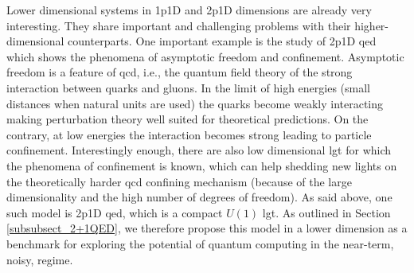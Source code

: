 Lower dimensional systems in \gls{1p1D} and \gls{2p1D} dimensions are already very interesting. They share important and challenging problems with their higher-dimensional counterparts. One important example is the study of \gls{2p1D} \gls{qed} which shows the phenomena of asymptotic freedom and confinement. Asymptotic freedom is a feature of \gls{qcd}, i.e., the quantum field theory of the strong interaction between quarks and gluons. In the limit of high energies (small distances when natural units are used) the quarks become weakly interacting making perturbation theory well suited for theoretical predictions. On the contrary, at low energies the interaction becomes strong leading to particle confinement. Interestingly enough, there are also low dimensional \gls{lgt} for which the phenomena of confinement is known, which can help  shedding new lights on the theoretically harder \gls{qcd} confining mechanism (because of the large dimensionality and the high number of degrees of freedom).
As said above, one such model is \gls{2p1D} \gls{qed}, which is a compact $U(1)$ \gls{lgt}. As outlined in Section \ref{subsubsect_2+1QED},  we therefore propose this model in a lower dimension as a benchmark 
for exploring the potential of quantum computing in the near-term, noisy, regime. 

